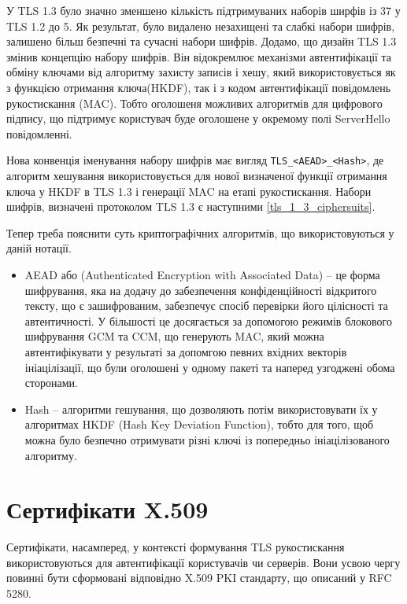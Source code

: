 У TLS 1.3 було значно зменшено кількість підтримуваних наборів ширфів із 37 у TLS 1.2 до 5. Як результат, було видалено незахищені та слабкі набори шифрів, залишено більш безпечні та сучасні набори шифрів. Додамо, що дизайн TLS 1.3 змінив концепцію набору шифрів. Він відокремлює механізми автентифікації та обміну ключами від алгоритму захисту записів і хешу, який використовується як з функцією отримання ключа(HKDF), так і з кодом автентифікації повідомлень рукостискання (MAC). Тобто оголошеня можливих алгоритмів для цифрового підпису, що підтримує користувач буде оголошене у окремому полі ServerHello повідомленні.

Нова конвенція іменування набору шифрів має вигляд \texttt{TLS\_<AEAD>\_<Hash>}, де алгоритм хешування використовується для нової визначеної функції отримання ключа у HKDF в TLS 1.3 і генерації MAC на етапі рукостискання. Набори шифрів, визначені протоколом TLS 1.3 є наступними \ref{tls_1_3_ciphersuits}.

Тепер треба пояснити суть криптографічних алгоритмів, що використовуються у даній нотації.
\begin{itemize}
    \item AEAD або (Authenticated Encryption with Associated Data) --  це форма шифрування, яка на додачу до забезпечення конфіденційності відкритого тексту, що є зашифрованим, забезпечує спосіб перевірки його цілісності та автентичності. У більшості це досягається за допомогою режимів блокового шифрування GCM та CCM, що генерують MAC, який можна автентифікувати у результаті за допомгою певних вхідних векторів ініацілізації, що були оголошені у одному пакеті та наперед узгоджені обома сторонами.
    \item Hash -- алгоритми гешування, що дозволяють потім використовувати їх у алгоритмах HKDF (Hash Key Deviation Function), тобто для того, щоб можна було безпечно отримувати різні ключі із попередньо ініацілізованого алгоритму.
\end{itemize}

\section{Сертифікати X.509}

Сертифікати, насамперед, у контексті формування TLS рукостискання використовуються для автентифікації користувачів чи серверів. Вони усвою чергу повинні бути сформовані відповідно X.509 PKI стандарту, що описаний у RFC 5280.

